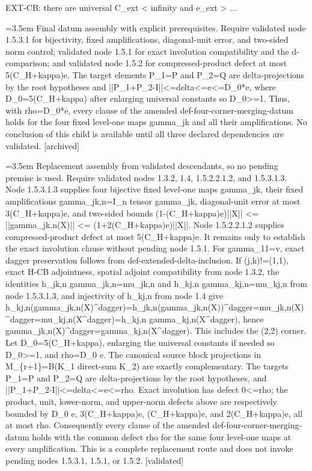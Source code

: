 \documentclass{article}
\newcommand{\step}[1]{\par\noindent\hangindent=3.5em\hangafter=1%
  \makebox[3.5em][l]{\textbf{#1.}}}
\newcommand{\steptag}[1]{\hfill{\small\textsf{[#1]}}}
\begin{document}
\begin{proofbox}{EXT-CB: there are universal C\_ext < infinity and e\_ext > ...}
\step{1.5.3.2} Final datum assembly with explicit prerequisites. Require validated node 1.5.3.1 for bijectivity, fixed amplifications, diagonal-unit error, and two-sided norm control; validated node 1.5.1 for exact involution compatibility and the d-comparison; and validated node 1.5.2 for compressed-product defect at most 5(C\_H+kappa)e. The target elements P\_1=P and P\_2=Q are delta-projections by the root hypotheses and ||P\_1+P\_2-I||<=delta<=e<=D\_0*e, where D\_0=5(C\_H+kappa) after enlarging universal constants so D\_0>=1. Thus, with rho=D\_0*e, every clause of the amended def-four-corner-merging-datum holds for the four fixed level-one maps gamma\_jk and all their amplifications. No conclusion of this child is available until all three declared dependencies are validated. \steptag{archived} \\[6pt]
\step{1.5.3.2.1} Replacement assembly from validated descendants, so no pending premise is used. Require validated nodes 1.3.2, 1.4, 1.5.2.2.1.2, and 1.5.3.1.3. Node 1.5.3.1.3 supplies four bijective fixed level-one maps gamma\_jk, their fixed amplifications gamma\_jk,n=I\_n tensor gamma\_jk, diagonal-unit error at most 3(C\_H+kappa)e, and two-sided bounds (1-(C\_H+kappa)e)||X|| <= ||gamma\_jk,n(X)|| <= (1+2(C\_H+kappa)e)||X||. Node 1.5.2.2.1.2 supplies compressed-product defect at most 5(C\_H+kappa)e. It remains only to establish the exact involution clause without pending node 1.5.1. For gamma\_11=v, exact dagger preservation follows from def-extended-delta-inclusion. If (j,k)!=(1,1), exact H-CB adjointness, spatial adjoint compatibility from node 1.3.2, the identities h\_jk,n gamma\_jk,n=mu\_jk,n and h\_kj,n gamma\_kj,n=mu\_kj,n from node 1.5.3.1.3, and injectivity of h\_kj,n from node 1.4 give h\_kj,n(gamma\_jk,n(X)\textasciicircum{}dagger)=h\_jk,n(gamma\_jk,n(X))\textasciicircum{}dagger=mu\_jk,n(X)\textasciicircum{}dagger=mu\_kj,n(X\textasciicircum{}dagger)=h\_kj,n gamma\_kj,n(X\textasciicircum{}dagger), hence gamma\_jk,n(X)\textasciicircum{}dagger=gamma\_kj,n(X\textasciicircum{}dagger). This includes the (2,2) corner. Let D\_0=5(C\_H+kappa), enlarging the universal constants if needed so D\_0>=1, and rho=D\_0 e. The canonical source block projections in M\_\{r+1\}=B(K\_1 direct-sum K\_2) are exactly complementary. The targets P\_1=P and P\_2=Q are delta-projections by the root hypotheses, and ||P\_1+P\_2-I||<=delta<=e<=rho. Exact involution has defect 0<=rho; the product, unit, lower-norm, and upper-norm defects above are respectively bounded by D\_0 e, 3(C\_H+kappa)e, (C\_H+kappa)e, and 2(C\_H+kappa)e, all at most rho. Consequently every clause of the amended def-four-corner-merging-datum holds with the common defect rho for the same four level-one maps at every amplification. This is a complete replacement route and does not invoke pending nodes 1.5.3.1, 1.5.1, or 1.5.2. \steptag{validated} \\[4pt]

\end{proofbox}
\end{document}
